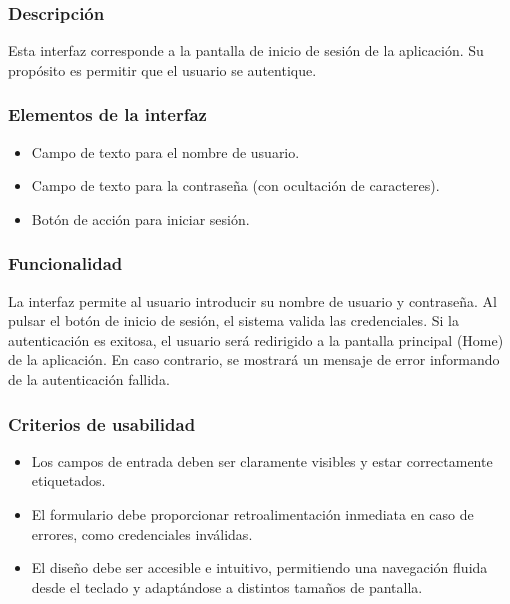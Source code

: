 \subsubsection{Descripción}
Esta interfaz corresponde a la pantalla de inicio de sesión de la aplicación. Su propósito es permitir que el usuario se autentique.

\subsubsection*{Elementos de la interfaz}
\begin{itemize}
  \item Campo de texto para el nombre de usuario.
  \item Campo de texto para la contraseña (con ocultación de caracteres).
  \item Botón de acción para iniciar sesión.
\end{itemize}

\subsubsection{Funcionalidad}
La interfaz permite al usuario introducir su nombre de usuario y contraseña. Al pulsar el botón de inicio de sesión, el sistema valida las credenciales. Si la autenticación es exitosa, el usuario será redirigido a la pantalla principal (Home) de la aplicación. En caso contrario, se mostrará un mensaje de error informando de la autenticación fallida.

\subsubsection{Criterios de usabilidad}
\begin{itemize}
  \item Los campos de entrada deben ser claramente visibles y estar correctamente etiquetados.
  \item El formulario debe proporcionar retroalimentación inmediata en caso de errores, como credenciales inválidas.
  \item El diseño debe ser accesible e intuitivo, permitiendo una navegación fluida desde el teclado y adaptándose a distintos tamaños de pantalla.
\end{itemize}

